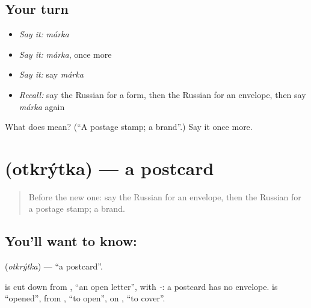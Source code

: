 \subsection*{Your turn}
\begin{itemize}
\raggedright
  \item \emph{Say it:} \emph{márka}
  \item \emph{Say it:} \emph{márka}, once more
  \item \emph{Say it:} say \emph{márka}
  \item \emph{Recall:} say the Russian for a form, then the Russian for an envelope, then say \emph{márka} again
\end{itemize}

\begin{tcolorbox}[breakable,colback=teal!4,colframe=teal!35!black,title={Before you move on}]
What does  mean? (\textquotedblleft{}A postage stamp; a brand\textquotedblright{}.) Say it once more.
\end{tcolorbox}
\section[\texorpdfstring{\ru{открытка} (otkrýtka)}{открытка (otkrýtka)}]{ (otkrýtka) — a postcard}

\label{lesson:RU-C161-otkrytka}



\begin{quote}
Before the new one: say the Russian for an envelope, then the Russian for a postage stamp; a brand.
\end{quote}

\subsection*{You'll want to know: }
\textbf{} (\emph{otkrýtka}) — \textquotedblleft{}a postcard\textquotedblright{}.

\begin{cousinweb}
\textbf{} is cut down from \emph{ }, \textquotedblleft{}an open letter\textquotedblright{}, with \emph{-}: a postcard has no envelope. \emph{} is \textquotedblleft{}opened\textquotedblright{}, from \emph{}, \textquotedblleft{}to open\textquotedblright{}, on \emph{}, \textquotedblleft{}to cover\textquotedblright{}.
\end{cousinweb}

